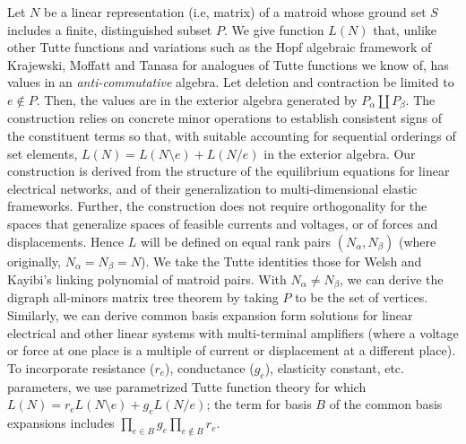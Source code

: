 \documentclass{article}
\begin{document}
Let $N$ be a linear representation (i.e, matrix) of a matroid whose ground
set $S$ includes a finite, distinguished subset $P$.  We give
function $L(N)$ that, unlike other Tutte functions and variations such as the 
Hopf algebraic framework
of
Krajewski, Moffatt and Tanasa
for analogues of Tutte functions we know of, has values
in an \emph{anti-commutative} algebra. Let deletion and contraction be limited
to $e\not\in P$.  Then, the values are in the exterior algebra generated
by $P_\alpha \coprod P_\beta$.  The construction relies on concrete minor operations
to establish consistent signs of the constituent terms so that, with suitable
accounting for sequential orderings of set elements, $L(N)=L(N\setminus e)+L(N/e)$
in the exterior algebra. Our construction is derived from the structure of
the equilibrium equations for linear electrical networks, and of their generalization
to multi-dimensional elastic frameworks.  Further, the construction does not
require orthogonality for the spaces that generalize spaces of feasible currents and voltages,
or of forces and displacements.  Hence $L$ will be defined on equal rank pairs $(N_\alpha, N_\beta)$
(where originally, $N_\alpha=N_\beta=N$).  We take the Tutte identities those for Welsh and Kayibi's
linking polynomial of matroid pairs. With $N_\alpha\neq N_\beta$, we can derive the digraph
all-minors matrix tree theorem by taking $P$ to be the set of vertices.  Similarly, we can
derive common basis expansion form solutions for
linear electrical and other linear systems with multi-terminal amplifiers (where a voltage or force
at one place is a multiple of current or displacement at a different place).  To incorporate
resistance ($r_e$), conductance ($g_e$), elasticity constant, etc. parameters, we use parametrized
Tutte function theory
for which $L(N)=r_e L(N\setminus e)+ g_e L(N/e)$; the
term for basis $B$ of the common basis expansions includes
$\prod _{e\in B} g_e \prod _{e\not\in B} r_e$.
\end{document}
